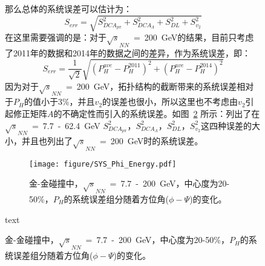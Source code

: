 \begin{figure}[htbp]
那么总体的系统误差可以估计为：
\begin{equation}
S_{err} = \sqrt{ S_{DCA_{p\pi}}^{2} + S_{DCA_{\Lambda}}^{2} + S_{DL}^{2} + S_{v_{2}}^{2} }
\end{equation}
在这里需要强调的是：对于$\sqrt{s}_{NN}$~=~200~GeV的结果，目前只考虑了2011年的数据和2014年的数据之间的差异，作为系统误差，即：
\begin{equation}
S_{err} = \frac{1}{\sqrt{2}} \sqrt{ (P_{H}^{ave}-P_{H}^{2011})^2 + (P_{H}^{ave}-P_{H}^{2014})^2 }
\end{equation}
因为对于$\sqrt{s}_{NN}$~=~200~GeV，拓扑结构的截断带来的系统误差相对于$P_{H}$的值小于3\%，并且$v_{2}$的误差也很小，所以这里也不考虑由$v_{2}$引起修正矩阵$A$的不确定性而引入的系统误差。如图~\ref{fig:sys_phi_energy} 所示：列出了在$\sqrt{s}_{NN}$~=~7.7~-~62.4~GeV $S_{DCA_{p\pi}}^{2}$，$S_{DCA_{\Lambda}}^{2}$，$S_{DL}^{2}$，$S_{v_{2}}^{2}$这四种误差的大小，并且也列出了$\sqrt{s}_{NN}$~=~200~GeV时的系统误差。
\begin{figure}[htbp]
\centering
\texttt{[image: figure/SYS\_Phi\_Energy.pdf]}
\caption{金-金碰撞中，$\sqrt{s}_{NN}$~=~7.7~-~200~GeV，中心度为20-50\%，$P_{H}$的系统误差组分随着方位角($\phi-\Psi$)的变化。}
\label{fig:sys_phi_energy}
\end{figure}


text



\end{figure}
